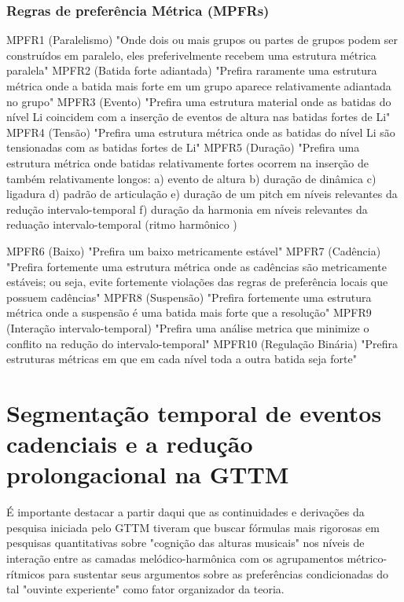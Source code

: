 \documentclass[
	12pt,				%
	openright,			%
	twoside,			%
	a4paper,			%
	english,			%
	french,				%
	spanish,			%
	brazil				%
	]{abntex2}
\begin{document}
\subsubsection{Regras de preferência Métrica (MPFRs) } 

\begin{citacao}
MPFR1 (Paralelismo) "Onde dois ou mais grupos ou partes de grupos podem ser construídos em paralelo, eles preferivelmente recebem uma estrutura métrica paralela" 
MPFR2 (Batida forte adiantada) "Prefira raramente uma estrutura métrica onde a batida mais forte em um grupo aparece relativamente adiantada no grupo" 
MPFR3 (Evento) "Prefira uma estrutura material onde as batidas do nível Li coincidem com a inserção de eventos de altura nas batidas fortes de Li" 
MPFR4 (Tensão) "Prefira uma estrutura métrica onde as batidas do nível Li são tensionadas com as batidas fortes de Li" 
MPFR5 (Duração) "Prefira uma estrutura métrica onde batidas relativamente fortes ocorrem na inserção de também relativamente longos: 
a) evento de altura 
b) duração de dinâmica 
c) ligadura 
d) padrão de articulação 
e) duração de um pitch em níveis relevantes da redução intervalo-temporal 
f) duração da harmonia em níveis relevantes  da reduação intervalo-temporal (ritmo harmônico )

MPFR6 (Baixo) "Prefira um baixo metricamente estável" 
MPFR7 (Cadência) "Prefira fortemente uma estrutura métrica onde as cadências são metricamente estáveis; ou seja, evite fortemente violações das regras de preferência locais que possuem cadências" 
MPFR8 (Suspensão) "Prefira fortemente uma estrutura métrica onde a suspensão é uma batida mais forte que a resolução" 
MPFR9 (Interação intervalo-temporal) "Prefira uma análise metrica que minimize o conflito na redução do intervalo-temporal" 
MPFR10 (Regulação Binária) "Prefira estruturas métricas em que em cada nível toda a outra batida seja forte" 
 \cite{lerdahl1983generative}
\end{citacao}



\section{Segmentação temporal de eventos cadenciais e a redução prolongacional na GTTM}


É importante destacar a partir daqui que as continuidades e derivações da pesquisa iniciada pelo GTTM tiveram que buscar fórmulas mais rigorosas em pesquisas quantitativas sobre "cognição das alturas musicais"\cite{krumhansl1990cognitive} nos níveis de interação entre as camadas melódico-harmônica com os agrupamentos métrico-rítmicos para sustentar seus argumentos sobre as preferências condicionadas do tal "ouvinte experiente"\cite[pg. 118]{lerdahl1983generative} como fator organizador da teoria. 
\end{document}
